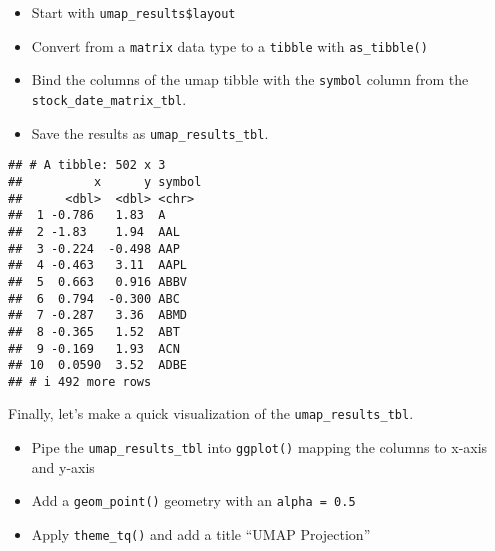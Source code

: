 \documentclass[
]{article}
\newenvironment{Shaded}{\begin{snugshade}}{\end{snugshade}}
\newcommand{\AttributeTok}[1]{\textcolor[rgb]{0.13,0.29,0.53}{#1}}
\newcommand{\CommentTok}[1]{\textcolor[rgb]{0.56,0.35,0.01}{\textit{#1}}}
\newcommand{\FunctionTok}[1]{\textcolor[rgb]{0.13,0.29,0.53}{\textbf{#1}}}
\newcommand{\NormalTok}[1]{#1}
\newcommand{\OtherTok}[1]{\textcolor[rgb]{0.56,0.35,0.01}{#1}}
\newcommand{\SpecialCharTok}[1]{\textcolor[rgb]{0.81,0.36,0.00}{\textbf{#1}}}
\newcommand{\StringTok}[1]{\textcolor[rgb]{0.31,0.60,0.02}{#1}}
\providecommand{\tightlist}{%
  \setlength{\itemsep}{0pt}\setlength{\parskip}{0pt}}
\begin{document}
\begin{itemize}
\tightlist
\item
  Start with \texttt{umap\_results\$layout}
\item
  Convert from a \texttt{matrix} data type to a \texttt{tibble} with
  \texttt{as\_tibble()}
\item
  Bind the columns of the umap tibble with the \texttt{symbol} column
  from the \texttt{stock\_date\_matrix\_tbl}.
\item
  Save the results as \texttt{umap\_results\_tbl}.
\end{itemize}

\begin{Shaded}
\end{Shaded}

\begin{verbatim}
## # A tibble: 502 x 3
##          x      y symbol
##      <dbl>  <dbl> <chr> 
##  1 -0.786   1.83  A     
##  2 -1.83    1.94  AAL   
##  3 -0.224  -0.498 AAP   
##  4 -0.463   3.11  AAPL  
##  5  0.663   0.916 ABBV  
##  6  0.794  -0.300 ABC   
##  7 -0.287   3.36  ABMD  
##  8 -0.365   1.52  ABT   
##  9 -0.169   1.93  ACN   
## 10  0.0590  3.52  ADBE  
## # i 492 more rows
\end{verbatim}

Finally, let's make a quick visualization of the
\texttt{umap\_results\_tbl}.

\begin{itemize}
\tightlist
\item
  Pipe the \texttt{umap\_results\_tbl} into \texttt{ggplot()} mapping
  the columns to x-axis and y-axis
\item
  Add a \texttt{geom\_point()} geometry with an \texttt{alpha\ =\ 0.5}
\item
  Apply \texttt{theme\_tq()} and add a title ``UMAP Projection''
\end{itemize}
\end{document}
